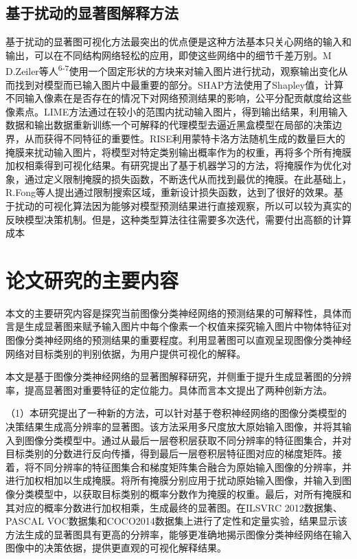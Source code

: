 \subsection{基于扰动的显著图解释方法}
基于扰动的显著图可视化方法最突出的优点便是这种方法基本只关心网络的输入和输出，可以在不同结构网络轻松的应用，即使这些网络中的细节千差万别。M D.Zeiler等人\textsuperscript{\cite{zeiler2014visualizing}6-7}使用一个固定形状的方块来对输入图片进行扰动，观察输出变化从而找到对模型而已输入图片中最重要的部分。SHAP方法\textsuperscript{\cite{lundberg2017unified}}使用了Shapley值，计算不同输入像素在是否存在的情况下对网络预测结果的影响，公平分配贡献度给这些像素点。LIME\textsuperscript{\cite{ribeiro2016should}}方法通过在较小的范围内扰动输入图片，得到输出结果，利用输入数据和输出数据重新训练一个可解释的代理模型去逼近黑盒模型在局部的决策边界，从而获得不同特征的重要性。RISE\textsuperscript{\cite{petsiuk2018rise}}利用蒙特卡洛方法随机生成的数量巨大的掩膜来扰动输入图片，将模型对特定类别输出概率作为的权重，再将多个所有掩膜加权相乘得到可视化结果。有研究提出了基于机器学习的方法，将掩膜作为优化对象，通过定义限制掩膜的损失函数，不断迭代从而找到最优的掩膜。在此基础上，R.Fong等人\textsuperscript{\cite{fong2019understanding,fong2017interpretable}}提出通过限制搜索区域，重新设计损失函数，达到了很好的效果。基于扰动的可视化算法因为能够对模型预测结果进行直接观察，所以可以较为真实的反映模型决策机制。但是，这种类型算法往往需要多次迭代，需要付出高额的计算成本

\section{论文研究的主要内容}
本文的主要研究内容是探究当前图像分类神经网络的预测结果的可解释性，具体而言是生成显著图来赋予输入图片中每个像素一个权值来探究输入图片中物体特征对图像分类神经网络的预测结果的重要程度。利用显著图可以直观呈现图像分类神经网络对目标类别的判别依据，为用户提供可视化的解释。  

本文是基于图像分类神经网络的显著图解释研究，并侧重于提升生成显著图的分辨率，提高显著图对重要特征的定位能力。具体而言本文提出了两种创新方法。

（1）本研究提出了一种新的方法，可以针对基于卷积神经网络的图像分类模型的决策结果生成高分辨率的显著图。该方法采用多尺度放大原始输入图像，并将其输入到图像分类模型中。通过从最后一层卷积层获取不同分辨率的特征图集合，并对目标类别的分数进行反向传播，得到最后一层卷积层特征图对应的梯度矩阵。接着，将不同分辨率的特征图集合和梯度矩阵集合融合为原始输入图像的分辨率，并进行加权相加以生成掩膜。将所有掩膜分别应用于扰动原始输入图像，并输入到图像分类模型中，以获取目标类别的概率分数作为掩膜的权重。最后，对所有掩膜和其对应的概率分数进行加权相乘，生成最终的显著图。在ILSVRC 2012数据集\textsuperscript{\cite{ILSVRC}}、PASCAL VOC数据集\textsuperscript{\cite{pascal}}和COCO2014数据集\textsuperscript{\cite{coco}}上进行了定性和定量实验，结果显示该方法生成的显著图具有更高的分辨率，能够更准确地揭示图像分类神经网络在输入图像中的决策依据，提供更直观的可视化解释结果。

